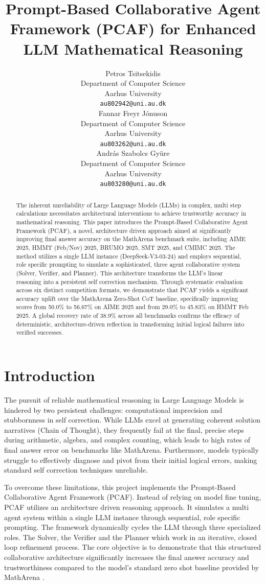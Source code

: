 \documentclass{article}
\title{Prompt-Based Collaborative Agent Framework (PCAF) for Enhanced LLM Mathematical Reasoning}
\author{%
  Petros Tsitsekidis \\
  Department of Computer Science\\
  Aarhus University\\
  \texttt{au802942@uni.au.dk} \\
  \And
  Fannar Freyr Jónuson \\
  Department of Computer Science\\
  Aarhus University\\
  \texttt{au803262@uni.au.dk} \\
  \And
  András Szabolcs Gyüre \\
  Department of Computer Science\\
  Aarhus University\\
  \texttt{au803280@uni.au.dk} \\
}
\begin{document}
\maketitle


\begin{abstract}
  The inherent unreliability of Large Language Models (LLMs) in complex, multi step calculations necessitates architectural 
  interventions to achieve trustworthy accuracy in mathematical reasoning. This paper introduces 
  the Prompt-Based Collaborative Agent Framework (PCAF), a novel, architecture driven approach 
  aimed at significantly improving final answer accuracy on the MathArena benchmark suite, including AIME 2025, HMMT (Feb/Nov) 2025, BRUMO 2025, SMT 2025, and CMIMC 2025.
  The method utilizes a single LLM instance (DeepSeek-V3-03-24) and employs sequential, 
  role specific prompting to simulate a sophisticated, three agent collaborative system (Solver, Verifier, and Planner).
  This architecture transforms the LLM's linear reasoning into a persistent self correction mechanism. 
  Through systematic evaluation across six distinct competition formats, we demonstrate that PCAF yields a significant accuracy uplift over the MathArena Zero-Shot CoT baseline, specifically improving scores from 50.0\% to 56.67\% on AIME 2025 and from 29.0\% to 45.83\% on HMMT Feb 2025. A global recovery rate of 38.9\% across all benchmarks confirms the efficacy of deterministic, architecture-driven reflection in transforming initial logical failures into verified successes.
\end{abstract}


\section{Introduction}

The pursuit of reliable mathematical reasoning in Large Language Models is hindered by two persistent challenges: computational imprecision and stubbornness in self correction. While LLMs excel at generating coherent solution narratives (Chain of Thought), they frequently fail at the final, precise steps during arithmetic, algebra, and complex counting, which leads to high rates of final answer error on benchmarks like MathArena. Furthermore, models typically struggle to effectively diagnose and pivot from their initial logical errors, making standard self correction techniques unreliable.

To overcome these limitations, this project implements the Prompt-Based Collaborative Agent Framework (PCAF). Instead of relying on model fine tuning, PCAF utilizes an architecture driven reasoning approach. It simulates a multi agent system within a single LLM instance through sequential, role specific prompting. The framework dynamically cycles the LLM through three specialized roles. The Solver, the Verifier and the Planner which work in an iterative, closed loop refinement process. The core objective is to demonstrate that this structured collaborative architecture significantly increases the final answer accuracy and trustworthiness compared to the model's standard zero shot baseline provided by MathArena \cite{MathArena2025}.
\end{document}
